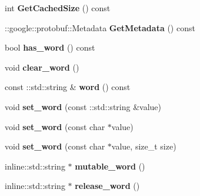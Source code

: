 \begin{DoxyCompactItemize}
\item 
\hypertarget{classlattice_1_1Subword_a93f2c5e53295755297f658ec54e81283}{
int {\bfseries GetCachedSize} () const }
\label{classlattice_1_1Subword_a93f2c5e53295755297f658ec54e81283}

\item 
\hypertarget{classlattice_1_1Subword_aec18683bcc8366e0cfae89e1cef3c57c}{
::google::protobuf::Metadata {\bfseries GetMetadata} () const }
\label{classlattice_1_1Subword_aec18683bcc8366e0cfae89e1cef3c57c}

\item 
\hypertarget{classlattice_1_1Subword_aa069cfdde7b9063126104f005aac89cb}{
bool {\bfseries has\_\-word} () const }
\label{classlattice_1_1Subword_aa069cfdde7b9063126104f005aac89cb}

\item 
\hypertarget{classlattice_1_1Subword_a0a849e147bf2c78d785197b897b14e53}{
void {\bfseries clear\_\-word} ()}
\label{classlattice_1_1Subword_a0a849e147bf2c78d785197b897b14e53}

\item 
\hypertarget{classlattice_1_1Subword_a2853badbab594ed129df0df6a0e97b65}{
const ::std::string \& {\bfseries word} () const }
\label{classlattice_1_1Subword_a2853badbab594ed129df0df6a0e97b65}

\item 
\hypertarget{classlattice_1_1Subword_a2b2aeb43d13e2e7e57b06afa5d0e50ec}{
void {\bfseries set\_\-word} (const ::std::string \&value)}
\label{classlattice_1_1Subword_a2b2aeb43d13e2e7e57b06afa5d0e50ec}

\item 
\hypertarget{classlattice_1_1Subword_aeeff8037e9406ee50534fbe6e1f6e702}{
void {\bfseries set\_\-word} (const char $\ast$value)}
\label{classlattice_1_1Subword_aeeff8037e9406ee50534fbe6e1f6e702}

\item 
\hypertarget{classlattice_1_1Subword_a3d6126168fe9ce91049687370dcb4977}{
void {\bfseries set\_\-word} (const char $\ast$value, size\_\-t size)}
\label{classlattice_1_1Subword_a3d6126168fe9ce91049687370dcb4977}

\item 
\hypertarget{classlattice_1_1Subword_a4495efa4267a4b124bba594f91bd73fe}{
inline::std::string $\ast$ {\bfseries mutable\_\-word} ()}
\label{classlattice_1_1Subword_a4495efa4267a4b124bba594f91bd73fe}

\item 
\hypertarget{classlattice_1_1Subword_ad6cb356c802ac727d24df1e2cd9ca9ed}{
inline::std::string $\ast$ {\bfseries release\_\-word} ()}
\label{classlattice_1_1Subword_ad6cb356c802ac727d24df1e2cd9ca9ed}


\end{DoxyCompactItemize}
